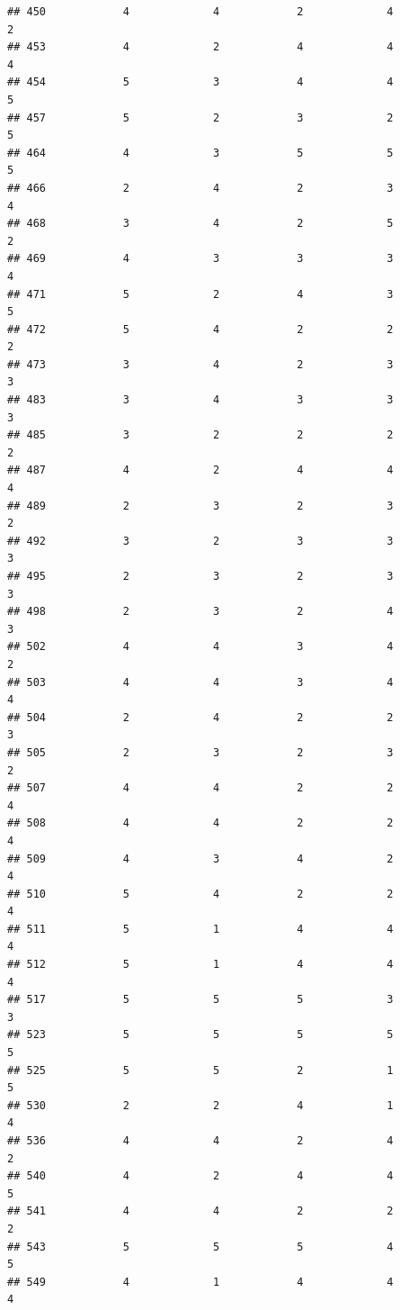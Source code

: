 \documentclass[
]{article}
\begin{document}
\begin{verbatim}
## 450            4             4            2             4          2
## 453            4             2            4             4          4
## 454            5             3            4             4          5
## 457            5             2            3             2          5
## 464            4             3            5             5          5
## 466            2             4            2             3          4
## 468            3             4            2             5          2
## 469            4             3            3             3          4
## 471            5             2            4             3          5
## 472            5             4            2             2          2
## 473            3             4            2             3          3
## 483            3             4            3             3          3
## 485            3             2            2             2          2
## 487            4             2            4             4          4
## 489            2             3            2             3          2
## 492            3             2            3             3          3
## 495            2             3            2             3          3
## 498            2             3            2             4          3
## 502            4             4            3             4          2
## 503            4             4            3             4          4
## 504            2             4            2             2          3
## 505            2             3            2             3          2
## 507            4             4            2             2          4
## 508            4             4            2             2          4
## 509            4             3            4             2          4
## 510            5             4            2             2          4
## 511            5             1            4             4          4
## 512            5             1            4             4          4
## 517            5             5            5             3          3
## 523            5             5            5             5          5
## 525            5             5            2             1          5
## 530            2             2            4             1          4
## 536            4             4            2             4          2
## 540            4             2            4             4          5
## 541            4             4            2             2          2
## 543            5             5            5             4          5
## 549            4             1            4             4          4

\end{verbatim}
\end{document}
